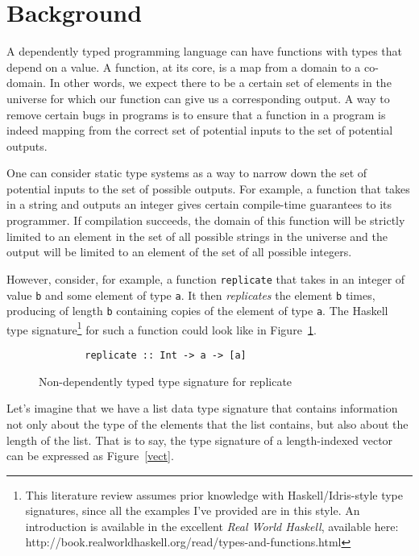 \section{Background}
A dependently typed programming language can have functions with types that
depend on a value. A function, at its core, is a map from a domain to a
co-domain. In other words, we expect there to be a certain set of elements in
the universe for which our function can give us a corresponding output. A way to
remove certain bugs in programs is to ensure that a function in a program is
indeed mapping from the correct set of potential inputs to the set of potential
outputs. 

One can consider static type systems as a way to narrow down the set of
potential inputs to the set of possible outputs. For example, a function that
takes in a string and outputs an integer gives certain compile-time guarantees
to its programmer. If compilation succeeds, the domain of this function will be
strictly limited to an element in the set of all possible strings in the
universe and the output will be limited to an element of the set of all possible
integers. 

However, consider, for example, a function \texttt{replicate} that takes in an
integer of value \texttt{b} and some element of type \texttt{a}. It then
\textit{replicates} the element \texttt{b} times, producing of length \texttt{b}
containing copies of the element of type \texttt{a}. The Haskell type
signature\footnote{This literature review assumes prior knowledge with
Haskell/Idris-style type signatures, since all the examples I've provided are in
this style. An introduction is available in the excellent \textit{Real World
Haskell}, available here:
http://book.realworldhaskell.org/read/types-and-functions.html} for such a
function could look like in Figure~\ref{replicate_dec}.

\begin{figure}[ht!!!!!!!]
    \caption{Non-dependently typed type signature for replicate}
    \label{replicate_dec}
    \begin{lstlisting}
        replicate :: Int -> a -> [a]
    \end{lstlisting}
\end{figure} 


Let's imagine that we have a list data type signature that contains information
not only about the type of the elements that the list contains, but also about
the length of the list. That is to say, the type signature of a length-indexed
vector can be expressed as Figure~\ref{vect}.

